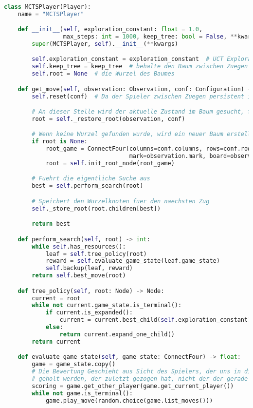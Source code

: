 \begin{lstlisting}[language=Python,caption=Die MCTSPlayer Klasse,label={lst:mcts-player}]

class MCTSPlayer(Player):
    name = "MCTSPlayer"

    def __init__(self, exploration_constant: float = 1.0,
                 max_steps: int = 1000, keep_tree: bool = False, **kwargs):
        super(MCTSPlayer, self).__init__(**kwargs)

        self.exploration_constant = exploration_constant  # UCT Exploration Konstante Cp
        self.keep_tree = keep_tree  # behalte den Baum zwischen Zuegen
        self.root = None  # die Wurzel des Baumes

    def get_move(self, observation: Observation, conf: Configuration) -> int:
        self.reset(conf)  # Da der Spieler zwischen Zuegen persistent ist, koennen hier Variablen pro Zug zurueckgesetzt werden

        # An dieser Stelle wird der aktuelle Zustand im Baum gesucht, falls der Baum zwischen Zuegen erhalten bleibt
        root = self._restore_root(observation, conf)

        # Wenn keine Wurzel gefunden wurde, wird ein neuer Baum erstellt
        if root is None:
            root_game = ConnectFour(columns=conf.columns, rows=conf.rows, inarow=conf.inarow,
                                    mark=observation.mark, board=observation.board)
            root = self.init_root_node(root_game)

        # Fuehrt die eigentliche Suche aus
        best = self.perform_search(root)

        # Speichert den Wurzelknoten fuer den naechsten Zug
        self._store_root(root.children[best])

        return best

    def perform_search(self, root) -> int:
        while self.has_resources():
            leaf = self.tree_policy(root)
            reward = self.evaluate_game_state(leaf.game_state)
            self.backup(leaf, reward)
        return self.best_move(root)

    def tree_policy(self, root: Node) -> Node:
        current = root
        while not current.game_state.is_terminal():
            if current.is_expanded():
                current = current.best_child(self.exploration_constant)
            else:
                return current.expand_one_child()
        return current

    def evaluate_game_state(self, game_state: ConnectFour) -> float:
        game = game_state.copy()
        # Die Bewertung Geschieht aus Sicht des Spielers, der uns in diesen Zustand gefuehrt hat, darum muss der Spieler
        # geholt werden, der zuletzt gezogen hat, nicht der der gerade an der Reihe ist.
        scoring = game.get_other_player(game.get_current_player())
        while not game.is_terminal():
            game.play_move(random.choice(game.list_moves()))


\end{lstlisting}
